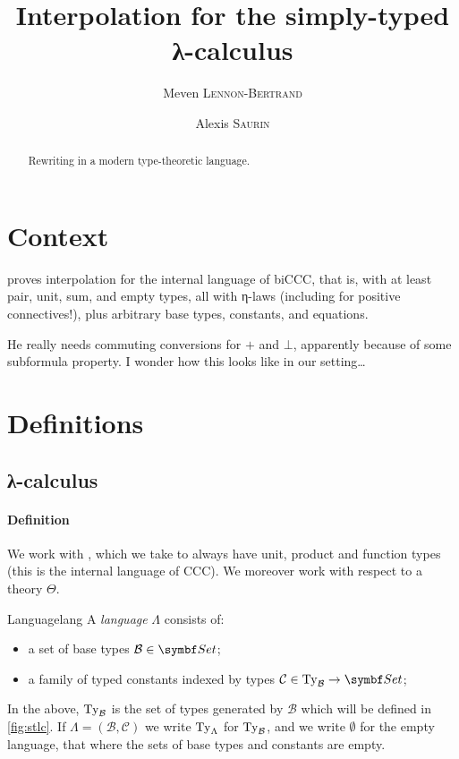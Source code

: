 \documentclass[10pt,a4paper]{notes-template}
\begin{document}
  \title{Interpolation for the simply-typed λ-calculus}

  \author{Meven \textsc{Lennon-Bertrand} \and Alexis \textsc{Saurin}}

\maketitle

\begin{abstract}
  Rewriting \textcite{Cubric1994} in a modern type-theoretic language.
\end{abstract}

\section{Context}

\textcite{Cubric1994} proves interpolation for the internal language of biCCC,
that is, \STLC with at least pair, unit, sum, and empty types, all with η-laws
(including for positive connectives!), plus arbitrary base types, constants,
and equations.

He really needs commuting conversions for \(+\) and \(\bot\), apparently because
of some subformula property. I wonder how this looks like in our setting…

\section{Definitions}

\subsection{λ-calculus}

\paragraph{Definition}
We work with \STLC, which we take to always have unit, product and function types
(\ie this is the internal language of CCC).
%
We moreover work with respect to a theory \(\Theta\).

\begin{definition}{Language}{lang}
  A \emph{language} \(\Lambda\) consists of:
  \begin{itemize}
    \item a set of base types \(\mathcal{B} \in \Set\);
    \item a family of typed constants indexed by types
      \(\mathcal{C} \in \Ty_{\mathcal{B}} \to \Set\);    
  \end{itemize}
  In the above, \(\operatorname{Ty}_{\mathcal{B}}\) is the set of types generated by
  \(\mathcal{B}\) which will be defined in \cref{fig:stlc}.
  If \(\Lambda = (\mathcal{B},\mathcal{C})\) we write
  \(\operatorname{Ty}_{\Lambda}\) for \(\operatorname{Ty}_{\mathcal{B}}\), and
  we write \(\emptyset\) for the empty language, \ie that where the sets
  of base types and constants are empty.
\end{definition}
\end{document}
